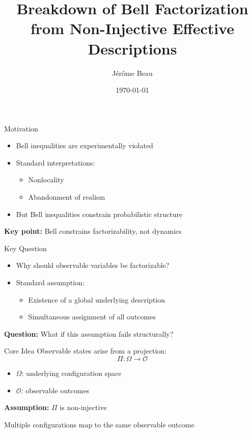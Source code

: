\documentclass{beamer}
\title[Breakdown of Bell Factorization]{Breakdown of Bell Factorization\\
from Non-Injective Effective Descriptions}
\author{Jérôme Beau}
\date{\today}
\begin{document}
  \frame{\titlepage}

  \begin{frame}{Motivation}
    \begin{itemize}
      \item Bell inequalities are experimentally violated
      \item Standard interpretations:
      \begin{itemize}
        \item Nonlocality
        \item Abandonment of realism
      \end{itemize}
      \item But Bell inequalities constrain probabilistic structure
    \end{itemize}

    \medskip

    \textbf{Key point:} Bell constrains factorizability, not dynamics
  \end{frame}

  \begin{frame}{Key Question}
    \begin{itemize}
      \item Why should observable variables be factorizable?
      \item Standard assumption:
      \begin{itemize}
        \item Existence of a global underlying description
        \item Simultaneous assignment of all outcomes
      \end{itemize}
    \end{itemize}

    \medskip

    \textbf{Question:} What if this assumption fails structurally?
  \end{frame}

  \begin{frame}{Core Idea}
    Observable states arise from a projection:
    \[
      \Pi : \Omega \to \mathcal{O}
    \]

    \begin{itemize}
      \item $\Omega$: underlying configuration space
      \item $\mathcal{O}$: observable outcomes
    \end{itemize}

    \medskip

    \textbf{Assumption:} $\Pi$ is non-injective

    \medskip

    Multiple configurations map to the same observable outcome
  \end{frame}
\end{document}
